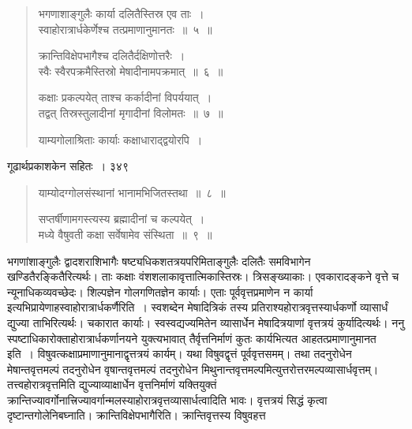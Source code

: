 \documentclass[11pt, openany]{book}
\begin{document}

\begin{quote}
{\ssi भगणाशाङ्गुलैः कार्या दलितैस्तिस्र एव ताः~।\\
स्वाहोरात्रार्धकेर्णेश्च तत्प्रमाणानुमानतः~॥~५~॥

क्रान्तिविक्षेपभागैश्च दलितैर्दक्षिणोत्तरैः~।\\
स्वैः स्वैरपक्रमैस्तिस्रो मेषादीनामपक्रमात्~॥~६~॥

कक्षाः प्रकल्पयेत् ताश्च कर्कादीनां विपर्ययात्~।\\
तद्वत् तिस्रस्तुलादीनां मृगादीनां विलोमतः~॥~७~॥ 

याम्यगोलाश्रिताः कार्याः कक्षाधाराद्द्वयोरपि~।}
%
\end{quote}

\newpage

\hspace{3cm} गूढार्थप्रकाशकेन सहितः~। \hfill ३४९
\vspace{1cm}




\begin{quote}
{\ssi याम्योदग्गोलसंस्थानां भानामभिजितस्तथा~॥~८~॥ 
 
सप्तर्षीणामगस्त्यस्य ब्रह्मादीनां च कल्पयेत्~।\\
मध्ये वैषुवती कक्षा सर्वेषामेव संस्थिता~॥~९~॥ }
\end{quote}
 भगणांशाङ्गुलैः द्वादशराशिभागैः षष्ट्यधिकशतत्रयपरिमिताङ्गुलैः दलितैः समविभागेन खण्डितैरङ्कितैरित्यर्थः। ताः कक्षाः वंशशलाकावृत्तात्मिकास्तिस्रः। त्रिसङ्ख्याकाः। एवकारादङ्कने वृत्ते च न्यूनाधिकव्यवच्छेदः। शिल्पज्ञेन गोलगणितज्ञेन कार्याः। एताः पूर्ववृत्तप्रमाणेन न कार्या इत्यभिप्रायेणाह\textendash स्वाहोरात्रार्धकर्णैरिति~। स्वशब्देन मेषादित्रिकं तस्य प्रतिराश्यहोरात्रवृत्तस्यार्धकर्णो व्यासार्धं द्युज्या ताभिरित्यर्थः। चकारात कार्याः। स्वस्वद्यज्यमितेन व्यासार्धेन मेषादित्रयाणां वृत्तत्रयं कुर्यादित्यर्थः। ननु स्पष्टाधिकारोक्ताहोरात्रार्धकर्णानयने युक्त्यभावात् तैर्वृत्तनिर्माणं कुतः कार्यभित्यत आह\textendash तत्प्रमाणानुमानत इति~। विषुवत्कक्षाप्रमाणानुमानाद्वृत्तत्रयं कार्यम्। यथा विषुवद्वृत्तं पूर्ववृत्तसमम्। तथा तदनुरोधेन मेषान्तवृत्तमल्पं तदनुरोधेन वृषान्तवृत्तमल्पं तदनुरोधेन मिथुनान्तवृत्तमल्पमित्युत्तरोत्तरमल्पव्यासार्धवृत्तम्। तत्त्वहोरात्रवृत्तमिति द्युज्याव्याक्षार्धेन वृत्तनिर्माणं यक्तियुक्तं क्रान्तिज्यावर्गोनात्त्रिज्यावर्गान्मलस्याहोरात्रवृत्तव्यासार्धत्वादिति भावः। वृत्तत्रयं सिद्धं कृत्वा दृष्टान्तगोलेनिबघ्नाति। क्रान्तिविक्षेपभागैरिति। क्रान्तिवृत्तस्य विषुवहत्त \textendash
\end{document}
